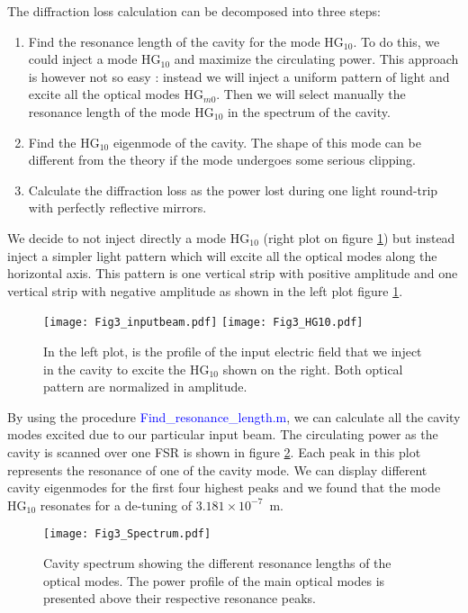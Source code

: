 The diffraction loss calculation can be decomposed into three steps:
\begin{enumerate}
  \item Find the resonance length of the cavity for the mode HG$_{10}$. To do this, we could inject a mode HG$_{10}$ and maximize the circulating power. This approach is however not so easy : instead we will inject a uniform pattern of light and excite all the optical modes HG$_{m0}$. Then we will select manually the resonance length of the mode HG$_{10}$ in the spectrum of the cavity.
  \item Find the HG$_{10}$ eigenmode of the cavity. The shape of this mode can be different from the theory if the mode undergoes some serious clipping.
  \item Calculate the diffraction loss as the power lost during one light round-trip with perfectly reflective mirrors.
\end{enumerate}

We decide to not inject directly a mode HG$_{10}$ (right plot on figure \ref{fig3:strip}) but instead inject a simpler light pattern which will excite all the optical modes along the horizontal axis. This pattern is one vertical strip with positive amplitude and one vertical strip with negative amplitude as shown in the left plot figure \ref{fig3:strip}.\\

\begin{figure}
\begin{center}
\texttt{[image: Fig3\_inputbeam.pdf]}\hfill
\texttt{[image: Fig3\_HG10.pdf]}
\end{center}
\caption{In the left plot, is the profile of the input electric field that we inject in the cavity to excite the HG$_{10}$ shown on the right. Both optical pattern are normalized in amplitude.\label{fig3:strip}}
\end{figure}

By using the procedure \textcolor{blue}{Find\_resonance\_length.m}, we can calculate all the cavity modes excited due to our particular input beam. The circulating power as the cavity is scanned over one FSR is shown in figure \ref{fig3:cav_spec}. Each peak in this plot represents the resonance of one of the cavity mode. We can display different cavity eigenmodes for the first four highest peaks and we found that the mode HG$_{10}$ resonates for a de-tuning of $3.181\times 10^{-7}$~m.

\begin{figure}
\begin{center}
\texttt{[image: Fig3\_Spectrum.pdf]}
\end{center}
\caption{Cavity spectrum showing the different resonance lengths of the optical modes. The power profile of the main optical modes is presented above their respective resonance peaks.\label{fig3:cav_spec}}
\end{figure}

